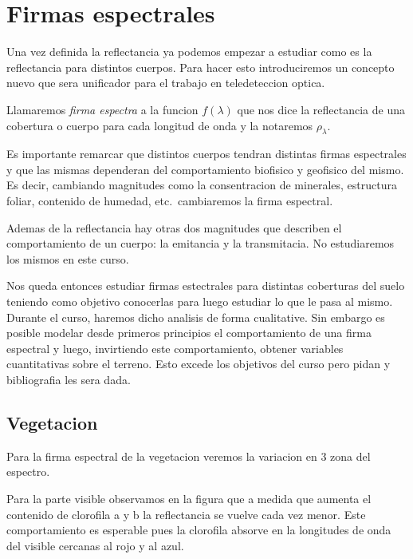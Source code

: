 \section{Firmas espectrales}

Una vez definida la reflectancia ya podemos empezar a estudiar como es la
reflectancia para distintos cuerpos. Para hacer esto introduciremos un concepto
nuevo que sera unificador para el trabajo en teledeteccion optica.

\begin{dex}
  Llamaremos \emph{firma espectra} a la funcion $f(\lambda)$ que nos dice la
  reflectancia de una cobertura o cuerpo para cada longitud de onda y la
  notaremos $\rho_\lambda$.
\end{dex}

Es importante remarcar que distintos cuerpos tendran distintas firmas
espectrales y que las mismas dependeran del comportamiento biofisico y geofisico
del mismo. Es decir, cambiando magnitudes como la consentracion de minerales,
estructura foliar, contenido de humedad, etc.\ cambiaremos la firma espectral.

\begin{obs}
  Ademas de la reflectancia hay otras dos magnitudes que describen el
  comportamiento de un cuerpo: la emitancia y la transmitacia. No estudiaremos
  los mismos en este curso.
\end{obs}

\begin{obs}
Nos queda entonces estudiar firmas estectrales para distintas coberturas del
suelo teniendo como objetivo conocerlas para luego estudiar lo que le pasa al
mismo. Durante el curso, haremos dicho analisis de forma cualitative. Sin
embargo es posible modelar desde primeros principios el comportamiento de una
firma espectral y luego, invirtiendo este comportamiento, obtener variables
cuantitativas sobre el terreno. Esto excede los objetivos del curso pero pidan y
bibliografia les sera dada.
\end{obs}

\subsection{Vegetacion}
Para la firma espectral de la vegetacion veremos la variacion en 3 zona del
espectro.

Para la parte visible observamos en la figura que a medida que aumenta el
contenido de clorofila a y b la reflectancia se vuelve cada vez menor. Este
comportamiento es esperable pues la clorofila absorve en la longitudes de onda
del visible cercanas al rojo y al azul.

